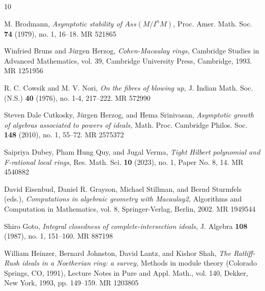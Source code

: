 \documentclass[11pt]{amsart}
\theoremstyle{plain}
\theoremstyle{plain}
\begin{document}
\providecommand{\bysame}{\leavevmode\hbox to3em{\hrulefill}\thinspace}
\providecommand{\MR}{\relax\ifhmode\unskip\space\fi MR }
\providecommand{\MRhref}[2]{
  \href{http://www.ams.org/mathscinet-getitem?mr=#1}{#2}
}
\begin{thebibliography}{10}


M. Brodmann, \emph{Asymptotic stability of $Ass(M/I^nM )$,} Proc. Amer. Math. Soc. \textbf{74} (1979), no. 1, 16–18. MR 521865

Winfried Bruns and J\"urgen Herzog, \emph{Cohen-Macaulay rings,} Cambridge Studies in Advanced Mathematics, vol. 39, Cambridge University Press, Cambridge, 1993. MR 1251956

R. C. Cowsik and M. V. Nori, \emph{On the fibres of blowing up,} J. Indian Math. Soc. (N.S.) \textbf{40} (1976), no. 1-4, 217–222. MR 572990

Steven Dale Cutkosky, J\"urgen Herzog, and Hema Srinivasan, \emph{Asymptotic growth of algebras associated to powers of ideals,} Math. Proc. Cambridge Philos. Soc. \textbf{148} (2010), no. 1, 55–72. MR 2575372

Saipriya Dubey, Pham Hung Quy, and Jugal Verma, \emph{Tight Hilbert polynomial and F-rational local rings}, Res. Math. Sci.
\textbf{10} (2023), no. 1, Paper No. 8, 14. MR 4540882

David Eisenbud, Daniel R. Grayson, Michael Stillman, and Bernd Sturmfels (eds.), \emph{Computations in algebraic geometry with Macaulay2,} Algorithms and Computation in Mathematics, vol. 8, Springer-Verlag, Berlin, 2002. MR 1949544


Shiro Goto, \emph{Integral closedness of complete-intersection ideals,} J. Algebra \textbf{108} (1987), no. 1, 151–160. MR 887198

William Heinzer, Bernard Johnston, David Lantz, and Kishor Shah, \emph{The Ratliff-Rush ideals in a Noetherian ring: a survey,} Methods in module theory (Colorado Springs, CO, 1991), Lecture Notes in Pure and Appl. Math., vol. 140, Dekker, New York, 1993, pp. 149–159. MR 1203805



\end{thebibliography}
\end{document}
